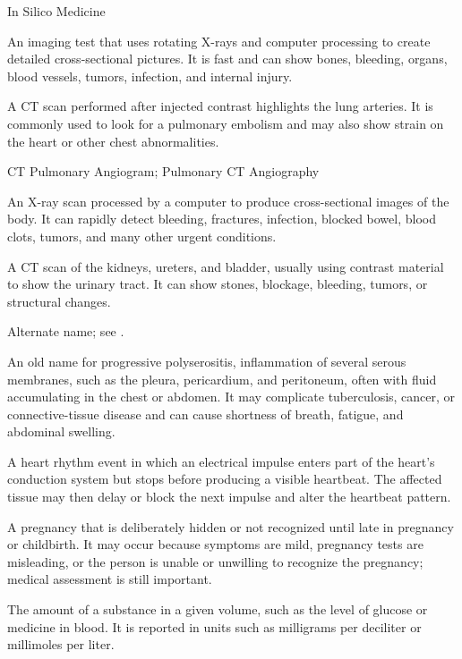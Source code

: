 \synonyms
In Silico Medicine

 An imaging test that uses rotating X-rays and computer processing to create detailed cross-sectional pictures. It is fast and can show bones, bleeding, organs, blood vessels, tumors, infection, and internal injury.

 A CT scan performed after injected contrast highlights the lung arteries. It is commonly used to look for a pulmonary embolism and may also show strain on the heart or other chest abnormalities.

\synonyms
CT Pulmonary Angiogram; Pulmonary CT Angiography

 An X-ray scan processed by a computer to produce cross-sectional images of the body. It can rapidly detect bleeding, fractures, infection, blocked bowel, blood clots, tumors, and many other urgent conditions.

 A CT scan of the kidneys, ureters, and bladder, usually using contrast material to show the urinary tract. It can show stones, blockage, bleeding, tumors, or structural changes.

 Alternate name; see .

 An old name for progressive polyserositis, inflammation of several serous membranes, such as the pleura, pericardium, and peritoneum, often with fluid accumulating in the chest or abdomen. It may complicate tuberculosis, cancer, or connective-tissue disease and can cause shortness of breath, fatigue, and abdominal swelling.

 A heart rhythm event in which an electrical impulse enters part of the heart's conduction system but stops before producing a visible heartbeat. The affected tissue may then delay or block the next impulse and alter the heartbeat pattern.

 A pregnancy that is deliberately hidden or not recognized until late in pregnancy or childbirth. It may occur because symptoms are mild, pregnancy tests are misleading, or the person is unable or unwilling to recognize the pregnancy; medical assessment is still important.

 The amount of a substance in a given volume, such as the level of glucose or medicine in blood. It is reported in units such as milligrams per deciliter or millimoles per liter.

